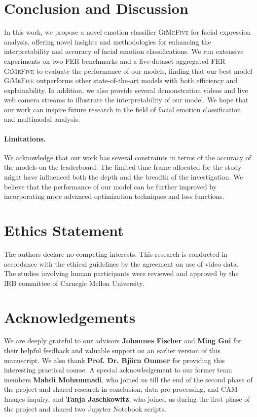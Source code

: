 \section{Conclusion and Discussion}
\label{sec:conclusion}

In this work, we propose a novel emotion classifier \textsc{GiMeFive} for facial expression analysis, 
offering novel insights and methodologies for enhancing the interpretability and accuracy of facial emotion classifications. 
We run extensive experiments on two FER benchmarks and a five-dataset aggregated FER \textsc{GiMeFive} to evaluate the performance of our models, 
finding that our best model \textsc{GiMeFive} outperforms other state-of-the-art models with both efficiency and explainability. 
In addition, 
we also provide several demonstration videos and live web camera streams to illustrate the interpretability of our model. 
We hope that our work can inspire future research in the field of facial emotion classification and multimodal analysis. 

\paragraph{Limitations.}
We acknowledge that our work has several constraints in terms of the accuracy of the models on the leaderboard. 
The limited time frame allocated for the study might have influenced both the depth and the breadth of the investigation. 
We believe that the performance of our model can be further improved by incorporating more advanced optimization techniques 
and loss functions. 

\section*{Ethics Statement}
The authors declare no competing interests. 
This research is conducted in accordance with the ethical guidelines by the agreement on use of video data. 
The studies involving human participants were reviewed and approved by the IRB committee of Carnegie Mellon University.

\section*{Acknowledgements}
We are deeply grateful to our advisors \textbf{Johannes Fischer} and \textbf{Ming Gui} for their helpful feedback and valuable support on an earlier version of this manuscript. 
We also thank \textbf{Prof. Dr. Björn Ommer} for providing this interesting practical course. 
A special acknowledgement to our former team members \textbf{Mahdi Mohammadi}, who joined us till the end of the 
second phase of the project and shared research in conclusion, data pre-processing, and CAM-Images inquiry, 
and \textbf{Tanja Jaschkowitz}, who joined us during the first phase of the project and shared two Jupyter Notebook scripts.

